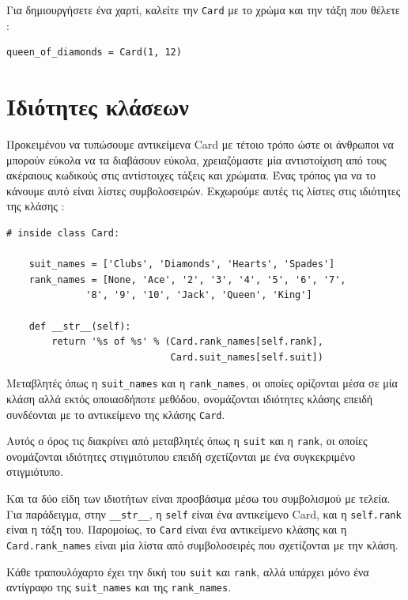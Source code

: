 \documentclass[10pt]{book}
\begin{document}
Για δημιουργήσετε ένα χαρτί, καλείτε την  {\tt Card}  με το χρώμα και την τάξη 
που θέλετε :

\begin{verbatim}
queen_of_diamonds = Card(1, 12)
\end{verbatim}
%


 
\section{Ιδιότητες κλάσεων}
\label{class.attribute}

Προκειμένου να τυπώσουμε αντικείμενα  Card  με τέτοιο τρόπο ώστε οι άνθρωποι 
να μπορούν εύκολα να τα διαβάσουν εύκολα, χρειαζόμαστε μία αντιστοίχιση από τους ακέραιους 
κωδικούς στις αντίστοιχες τάξεις και χρώματα.  Ένας τρόπος για να το κάνουμε αυτό είναι 
λίστες συμβολοσειρών.  Εκχωρούμε αυτές τις λίστες στις ιδιότητες της κλάσης :

\begin{verbatim}
# inside class Card:

    suit_names = ['Clubs', 'Diamonds', 'Hearts', 'Spades']
    rank_names = [None, 'Ace', '2', '3', '4', '5', '6', '7',
              '8', '9', '10', 'Jack', 'Queen', 'King']

    def __str__(self):
        return '%s of %s' % (Card.rank_names[self.rank],
                             Card.suit_names[self.suit])
\end{verbatim}
%
 Μεταβλητές όπως η  \verb"suit_names"  και η  \verb"rank_names",  οι 
οποίες ορίζονται μέσα σε μία κλάση αλλά εκτός οποιασδήποτε μεθόδου, ονομάζονται ιδιότητες 
κλάσης επειδή συνδέονται με το αντικείμενο της κλάσης  {\tt Card}.

 Αυτός ο όρος τις διακρίνει από μεταβλητές όπως η  {\tt suit}  και η  {\tt rank},  οι οποίες ονομάζονται ιδιότητες στιγμιότυπου επειδή σχετίζονται με ένα συγκεκριμένο στιγμιότυπο.

Και τα δύο είδη των ιδιοτήτων είναι προσβάσιμα μέσω του συμβολισμού με τελεία.  Για 
παράδειγμα, στην  \verb"__str__",  η  {\tt self}  είναι ένα αντικείμενο 
 Card,  και η  {\tt self.rank}  είναι η τάξη του.  Παρομοίως, το  {\tt Card}  είναι ένα αντικείμενο κλάσης και η  \verb"Card.rank_names"  είναι μία 
λίστα από συμβολοσειρές που σχετίζονται με την κλάση.

Κάθε τραπουλόχαρτο έχει την δική του  {\tt suit}  και  {\tt rank},  αλλά 
υπάρχει μόνο ένα αντίγραφο της  \verb"suit_names"  και της  \verb"rank_names".
\end{document}
